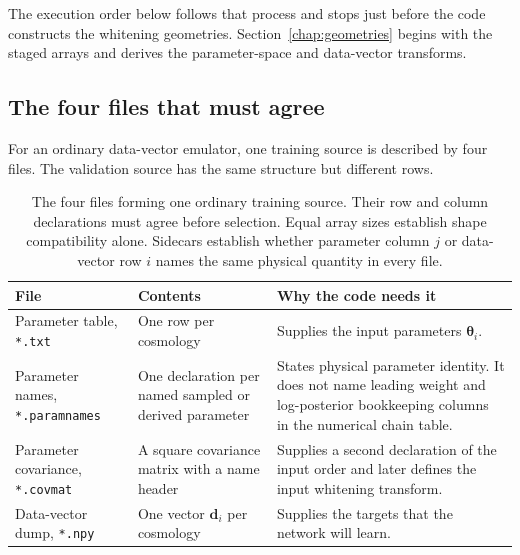 \documentclass[10pt,aps,prd,twocolumn,nofootinbib]{revtex4-2}
\newcommand{\code}[1]{\texttt{#1}}
\newcommand{\btheta}{\boldsymbol{\theta}}
\newcommand{\bd}{\mathbf{d}}
\begin{document}
The execution order below follows that process and stops just before
the code constructs the whitening geometries.  Section~\ref{chap:geometries} begins with the
staged arrays and derives the parameter-space and data-vector transforms.

\subsection{The four files that must agree}

For an ordinary data-vector emulator, one training source is described by
four files.  The validation source has the same structure but different
rows.

\begin{table}[t]
\centering
\begin{tabular}{p{}p{}p{}}
\toprule
File & Contents & Why the code needs it \\
\midrule
Parameter table, \code{*.txt}
  & One row per cosmology
  & Supplies the input parameters $\btheta_i$.  \\
Parameter names, \code{*.paramnames}
  & One declaration per named sampled or derived parameter
  & States physical parameter identity.  It does not name leading weight and
    log-posterior bookkeeping columns in the numerical chain table.  \\
Parameter covariance, \code{*.covmat}
  & A square covariance matrix with a name header
  & Supplies a second declaration of the input order and later defines the
    input whitening transform.  \\
Data-vector dump, \code{*.npy}
  & One vector $\bd_i$ per cosmology
  & Supplies the targets that the network will learn.  \\
\bottomrule
\end{tabular}
\caption{The four files forming one ordinary training source.  Their row and
column declarations must agree before selection.  Equal array sizes establish
shape compatibility alone.  Sidecars establish whether parameter column $j$ or
data-vector row $i$ names the same physical quantity in every file.}
\label{tab:source-files}
\end{table}
\end{document}
